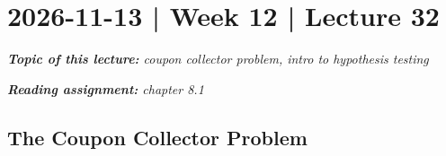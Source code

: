 \documentclass[10pt]{article}
\theoremstyle{definition}
\newcommand{\1}[1]{\textbf{1}_{\left[#1\right]}} %
\begin{document}
\newpage
\section{2026-11-13 | Week 12 | Lecture 32}
\begin{center}
  \begin{tcolorbox}[width=0.9\textwidth, colback=white, colframe=black]
    \textit{\textbf{Topic of this lecture:} coupon collector problem, intro to
    hypothesis testing}

    \textit{\textbf{Reading assignment:} chapter 8.1}
  \end{tcolorbox}
\end{center}

\subsection{The Coupon Collector Problem}
\end{document}
